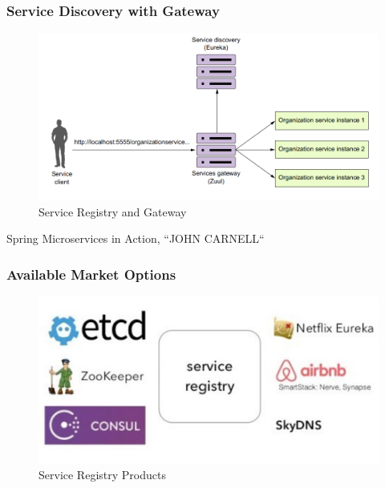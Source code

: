 \documentclass{beamer}
\begin{document}
		\begin{frame}
		\frametitle{Service Discovery with Gateway}
			\begin{figure}[h]
				\centering
				\includegraphics[width=.8\linewidth]{img/zull-and-sd.png}
				\caption{Service Registry and Gateway}
			\end{figure}
		\vspace{10mm}
		\tiny{Spring Microservices in Action, ``JOHN CARNELL``}	
		\end{frame}
		
		\begin{frame}
			\frametitle{Available Market Options}
				\begin{figure}[h]
						\centering
						\includegraphics[width=.8\linewidth]{img/SR.png}
						\caption{Service Registry Products}
				\end{figure}
		\end{frame}
\end{document}
